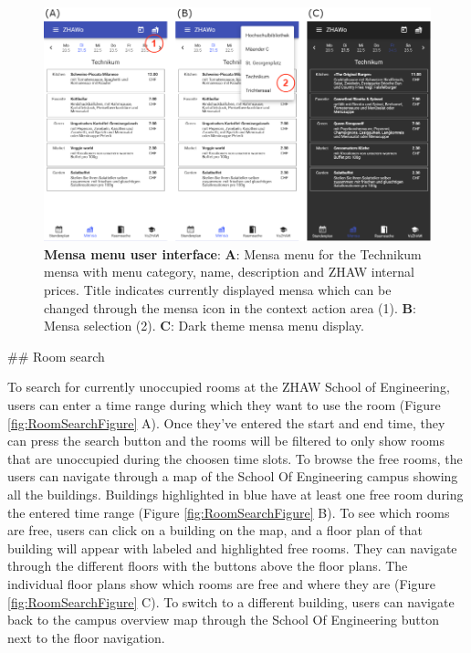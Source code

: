 \begin{markdown}
\begin{figure}[H]
  \includegraphics[width=16cm, center]{./figures/menu_figure.png}
  \captionsetup{width=15.5cm}
  \caption[Mensa menu user interface]{\textbf{Mensa menu user interface}: \textbf{A}: Mensa menu for the Technikum mensa with menu category, name, description and ZHAW internal prices. Title indicates currently displayed mensa which can be changed through the mensa icon in the context action area (1). \textbf{B}: Mensa selection (2). \textbf{C}: Dark theme mensa menu display.}
  \label{fig:MenuFigure}
\end{figure}

\newpage

## Room search

To search for currently unoccupied rooms at the ZHAW School of Engineering, users can enter a time range during which they want to use the room (Figure \ref{fig:RoomSearchFigure} A). Once they've entered the start and end time, they can press the search button and the rooms will be filtered to only show rooms that are unoccupied during the choosen time slots. To browse the free rooms, the users can navigate through a map of the School Of Engineering campus showing all the buildings. Buildings highlighted in blue have at least one free room during the entered time range (Figure \ref{fig:RoomSearchFigure} B). To see which rooms are free, users can click on a building on the map, and a floor plan of that building will appear with labeled and highlighted free rooms. They can navigate through the different floors with the buttons above the floor plans. The individual floor plans show which rooms are free and where they are (Figure \ref{fig:RoomSearchFigure} C). To switch to a different building, users can navigate back to the campus overview map through the School Of Engineering button next to the floor navigation.


\end{markdown}
